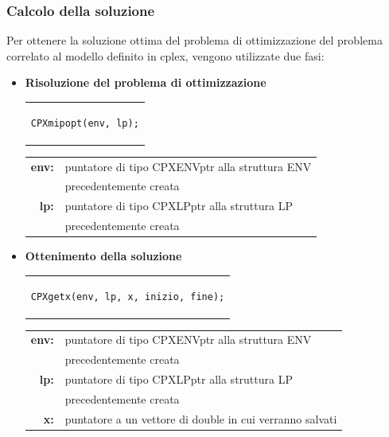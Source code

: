 \subsubsection{Calcolo della soluzione}
Per ottenere la soluzione ottima del problema di ottimizzazione del problema correlato al modello definito in cplex, vengono utilizzate due fasi:
\begin{itemize}
\item{\textbf{Risoluzione del problema di ottimizzazione}\\
\begin{center}
\begin{tabular}{c}
\begin{lstlisting}[linewidth=120pt, basicstyle=\footnotesize\sffamily,]
CPXmipopt(env, lp);
\end{lstlisting}
\end{tabular}
\end{center}
\begin{table}[h]
\centering
\begin{tabular}{rl}
\textbf{env:} & {puntatore di tipo CPXENVptr alla struttura ENV}\\
& {precedentemente creata}\\
\textbf{lp:} & {puntatore di tipo CPXLPptr alla struttura LP}\\
& {precedentemente creata}\\
\end{tabular}
\end{table}
}
\item{\textbf{Ottenimento della soluzione}\\
\begin{center}
\begin{tabular}{c}
\begin{lstlisting}[linewidth=230pt, basicstyle=\footnotesize\sffamily,]
CPXgetx(env, lp, x, inizio, fine);
\end{lstlisting}
\end{tabular}
\end{center}
\begin{table}[h]
\centering
\begin{tabular}{rl}
\textbf{env:} & {puntatore di tipo CPXENVptr alla struttura ENV}\\
& {precedentemente creata}\\
\textbf{lp:} & {puntatore di tipo CPXLPptr alla struttura LP}\\
& {precedentemente creata}\\
\textbf{x:} & {puntatore a un vettore di double in cui verranno salvati}\\

\end{tabular}
\end{table}}
\end{itemize}
